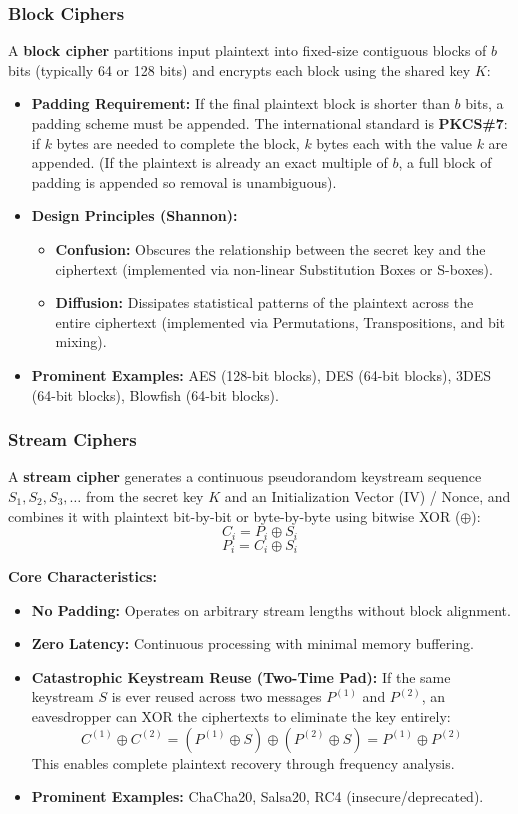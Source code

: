 \subsubsection{Block Ciphers}

A \textbf{block cipher} partitions input plaintext into fixed-size contiguous blocks of $b$ bits (typically 64 or 128 bits) and encrypts each block using the shared key $K$:
\begin{itemize}
\item \textbf{Padding Requirement:} If the final plaintext block is shorter than $b$ bits, a padding scheme must be appended. The international standard is \textbf{PKCS\#7}: if $k$ bytes are needed to complete the block, $k$ bytes each with the value $k$ are appended. (If the plaintext is already an exact multiple of $b$, a full block of padding is appended so removal is unambiguous).
\item \textbf{Design Principles (Shannon):}
\begin{itemize}
\item \textbf{Confusion:} Obscures the relationship between the secret key and the ciphertext (implemented via non-linear Substitution Boxes or S-boxes).
\item \textbf{Diffusion:} Dissipates statistical patterns of the plaintext across the entire ciphertext (implemented via Permutations, Transpositions, and bit mixing).
\end{itemize}
\item \textbf{Prominent Examples:} AES (128-bit blocks), DES (64-bit blocks), 3DES (64-bit blocks), Blowfish (64-bit blocks).
\end{itemize}

\subsubsection{Stream Ciphers}

A \textbf{stream cipher} generates a continuous pseudorandom keystream sequence $S_1, S_2, S_3, \dots$ from the secret key $K$ and an Initialization Vector ($\text{IV}$) / Nonce, and combines it with plaintext bit-by-bit or byte-by-byte using bitwise XOR ($\oplus$):
\[ C_i = P_i \oplus S_i \]
\[ P_i = C_i \oplus S_i \]

\textbf{Core Characteristics:}
\begin{itemize}
\item \textbf{No Padding:} Operates on arbitrary stream lengths without block alignment.
\item \textbf{Zero Latency:} Continuous processing with minimal memory buffering.
\item \textbf{Catastrophic Keystream Reuse (Two-Time Pad):} If the same keystream $S$ is ever reused across two messages $P^{(1)}$ and $P^{(2)}$, an eavesdropper can XOR the ciphertexts to eliminate the key entirely:
\[ C^{(1)} \oplus C^{(2)} = (P^{(1)} \oplus S) \oplus (P^{(2)} \oplus S) = P^{(1)} \oplus P^{(2)} \]
This enables complete plaintext recovery through frequency analysis.
\item \textbf{Prominent Examples:} ChaCha20, Salsa20, RC4 (insecure/deprecated).
\end{itemize}

